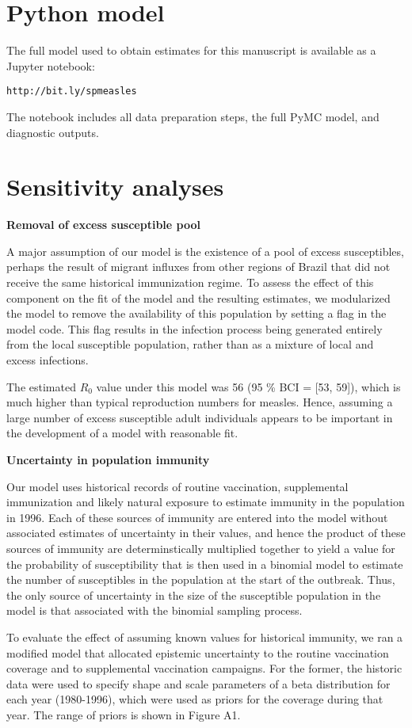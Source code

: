 \appendix

\section{Python model}

The full model used to obtain estimates for this manuscript is available as a Jupyter notebook:

\verb|http://bit.ly/spmeasles|

The notebook includes all data preparation steps, the full PyMC model, and diagnostic outputs.

\section{Sensitivity analyses}

\textbf{Removal of excess susceptible pool}

A major assumption of our model is the existence of a pool of excess susceptibles, perhaps the result of migrant influxes from other regions of Brazil that did not receive the same historical immunization regime. To assess the effect of this component on the fit of the model and the resulting estimates, we modularized the model to remove the availability of this population by setting a flag in the model code. This flag results in the infection process being generated entirely from the local susceptible population, rather than as a mixture of local and excess infections.

The estimated $R_0$ value under this model was 56 (95 \% BCI = [53, 59]), which is much higher than typical reproduction numbers for measles\cite{Durrheim_2014}. Hence, assuming a large number of excess susceptible adult individuals appears to be important in the development of a model with reasonable fit.

\textbf{Uncertainty in population immunity}

Our model uses historical records of routine vaccination, supplemental immunization and likely natural exposure to estimate immunity in the population in 1996. Each of these sources of immunity are entered into the model without associated estimates of uncertainty in their values, and hence the product of these sources of immunity are determinstically multiplied together to yield a value for the probability of susceptibility that is then used in a binomial model to estimate the number of susceptibles in the population at the start of the outbreak. Thus, the only source of uncertainty in the size of the susceptible population in the model is that associated with the binomial sampling process.

To evaluate the effect of assuming known values for historical immunity, we ran a modified model that allocated epistemic uncertainty to the routine vaccination coverage and to supplemental vaccination campaigns. For the former, the historic data were used to specify shape and scale parameters of a beta distribution for each year (1980-1996), which were used as priors for the coverage during that year. The range of priors is shown in Figure A1.